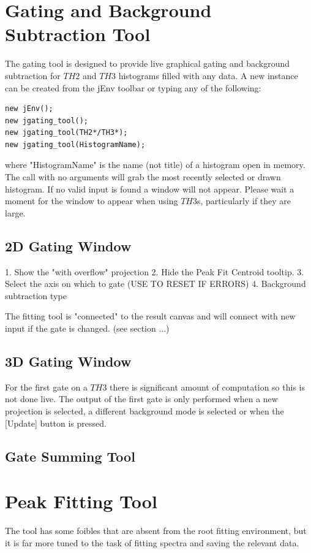 \documentclass[a4paper,10pt]{article}
\begin{document}
\section{Gating and Background Subtraction Tool}
The gating tool is designed to provide live graphical gating and background subtraction for $TH2$ and $TH3$ histograms filled with any data. 
A new instance can be created from the jEnv toolbar or typing any of the following:
\lstset{language=C++}
\begin{lstlisting}
new jEnv();
new jgating_tool();
new jgating_tool(TH2*/TH3*);
new jgating_tool(HistogramName);
\end{lstlisting}
where "HistogramName" is the name (not title) of a histogram open in memory. The call with no arguments will grab the most recently selected or drawn histogram. If no valid input is found a window will not appear. Please wait a moment for the window to appear when using $TH3$s, particularly if they are large.

\subsection{2D Gating Window}

1. Show the "with overflow" projection
2. Hide the Peak Fit Centroid tooltip.
3. Select the axis on which to gate (USE TO RESET IF ERRORS)
4. Background subtraction type


The fitting tool is "connected" to the result canvas and will connect with new input if the gate is changed. (see section ...)

\subsection{3D Gating Window}

For the first gate on a $TH3$ there is significant amount of computation so this is not done live. The output of the first gate is only performed when a new projection is selected, a different background mode is selected or when the [Update] button is pressed.

\subsection{Gate Summing Tool}





\section{Peak Fitting Tool}
The tool has some foibles that are absent from the root fitting environment, but it is far more tuned to the task of fitting spectra and saving the relevant data.
\end{document}
